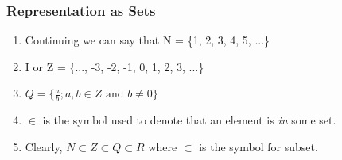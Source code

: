 \documentclass[aspectratio=1610]{beamer}
\begin{document}
\begin{frame}
 \frametitle{Representation as Sets}
 \begin{enumerate}
  \item Continuing we can say that N = \{1, 2, 3, 4, 5, ...\}
  \item I or Z = \{..., -3, -2, -1, 0, 1, 2, 3, ...\}
  \item $Q = \{\frac{a}{b}; a, b\in Z \text{ and } b \ne 0\}$
  \item $\in$ is the symbol used to denote that an element is \textit{in} some 
set.
  \item Clearly, $N\subset Z\subset Q\subset R$ where $\subset$ is the symbol 
for subset.
\end{enumerate}

\end{frame}
\end{document}
